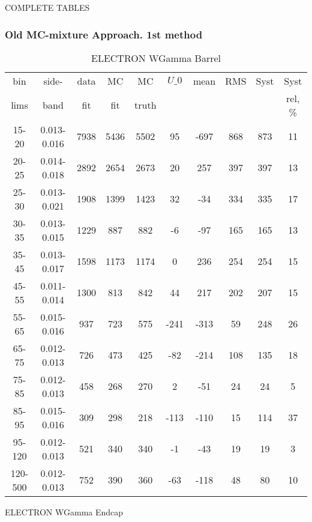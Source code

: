 \documentclass{beamer}
\begin{document}
\begin{frame}
\huge
COMPLETE TABLES
\end{frame}

\begin{frame}\frametitle{Old MC-mixture Approach. 1st method}
\begin{table}[h]
  \scriptsize
  \begin{center}
  \caption{ELECTRON WGamma Barrel}
  \begin{tabular}{|c|c|c|c|c|c|c|c|c|c|}
    bin & side- & data & MC & MC    & $U\_{0}$ & mean & RMS & Syst & Syst \\ 
    lims & band & fit & fit & truth &       &      &     &      & rel, \% \\ \hline
    15-20 & 0.013-0.016 & 7938 & 5436 & 5502 & 95 & -697 & 868 & 873 & 11  \\ \hline
    20-25 & 0.014-0.018 & 2892 & 2654 & 2673 & 20 & 257 & 397 & 397 & 13  \\ \hline
    25-30 & 0.013-0.021 & 1908 & 1399 & 1423 & 32 & -34 & 334 & 335 & 17  \\ \hline
    30-35 & 0.013-0.015 & 1229 & 887 & 882 & -6 & -97 & 165 & 165 & 13  \\ \hline
    35-45 & 0.013-0.017 & 1598 & 1173 & 1174 & 0 & 236 & 254 & 254 & 15  \\ \hline
    45-55 & 0.011-0.014 & 1300 & 813 & 842 & 44 & 217 & 202 & 207 & 15  \\ \hline
    55-65 & 0.015-0.016 & 937 & 723 & 575 & -241 & -313 & 59 & 248 & 26  \\ \hline
    65-75 & 0.012-0.013 & 726 & 473 & 425 & -82 & -214 & 108 & 135 & 18  \\ \hline
    75-85 & 0.012-0.013 & 458 & 268 & 270 & 2 & -51 & 24 & 24 & 5  \\ \hline
    85-95 & 0.015-0.016 & 309 & 298 & 218 & -113 & -110 & 15 & 114 & 37  \\ \hline
    95-120 & 0.012-0.013 & 521 & 340 & 340 & -1 & -43 & 19 & 19 & 3  \\ \hline
    120-500 & 0.012-0.013 & 752 & 390 & 360 & -63 & -118 & 48 & 80 & 10  \\ \hline
  \end{tabular}
  \label{tab:systSbVar_Meth1_ELECTRON_WGamma_Barrel}
  \end{center}
\end{table}
\begin{table}[h]
  \scriptsize
  \begin{center}
  \caption{ELECTRON WGamma Endcap}

\end{center}
\end{table}
\end{frame}
\end{document}
